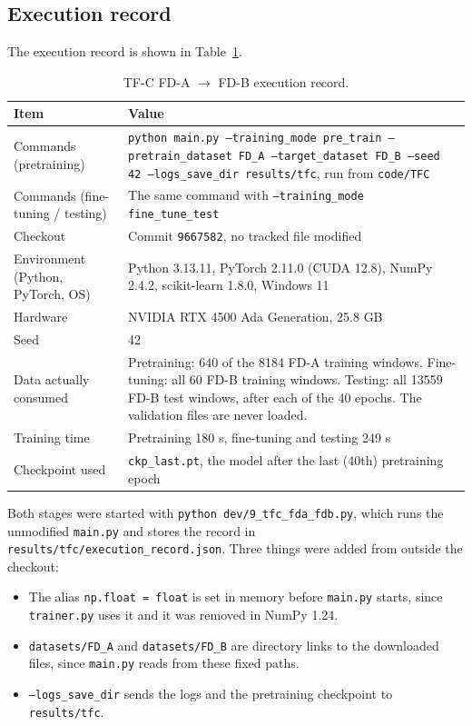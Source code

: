 \documentclass[a4paper,11pt]{article}
\newcommand{\code}[1]{\texttt{#1}}
\begin{document}
\subsection{Execution record}
The execution record is shown in Table~\ref{tab:tfc-record}.

\begin{table}[htbp]
    \centering
    \small
    \begin{tabular}{l p{9.5cm}}
        \toprule
        Item & Value \\
        \midrule
        Commands (pretraining) & \code{python main.py --training\_mode pre\_train --pretrain\_dataset FD\_A --target\_dataset FD\_B --seed 42 --logs\_save\_dir results/tfc}, run from \code{code/TFC} \\
        Commands (fine-tuning / testing) & The same command with \code{--training\_mode fine\_tune\_test} \\
        Checkout & Commit \code{9667582}, no tracked file modified \\
        Environment (Python, PyTorch, OS) & Python 3.13.11, PyTorch 2.11.0 (CUDA 12.8), NumPy 2.4.2, scikit-learn 1.8.0, Windows 11 \\
        Hardware & NVIDIA RTX 4500 Ada Generation, 25.8 GB \\
        Seed & 42 \\
        Data actually consumed & Pretraining: 640 of the 8184 FD-A training windows. Fine-tuning: all 60 FD-B training windows. Testing: all 13559 FD-B test windows, after each of the 40 epochs. The validation files are never loaded. \\
        Training time & Pretraining 180 s, fine-tuning and testing 249 s \\
        Checkpoint used & \code{ckp\_last.pt}, the model after the last (40th) pretraining epoch \\
        \bottomrule
    \end{tabular}
    \caption{TF-C FD-A $\rightarrow$ FD-B execution record.}
    \label{tab:tfc-record}
\end{table}

Both stages were started with \code{python dev/9\_tfc\_fda\_fdb.py}, which runs the unmodified \code{main.py} and stores the record in \code{results/tfc/execution\_record.json}. Three things were added from outside the checkout:
\begin{itemize}
    \item The alias \code{np.float = float} is set in memory before \code{main.py} starts, since \code{trainer.py} uses it and it was removed in NumPy 1.24.
    \item \code{datasets/FD\_A} and \code{datasets/FD\_B} are directory links to the downloaded files, since \code{main.py} reads from these fixed paths.
    \item \code{--logs\_save\_dir} sends the logs and the pretraining checkpoint to \code{results/tfc}.
\end{itemize}
\end{document}
